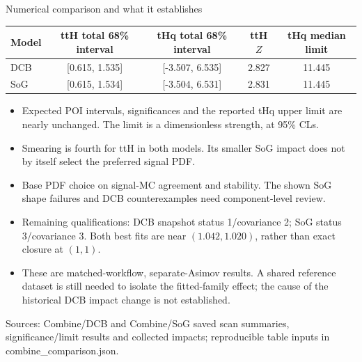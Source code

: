 \documentclass[aspectratio=169,10pt]{beamer}
\begin{document}
\begin{frame}{Numerical comparison and what it establishes}
\begin{center}\small
\begin{tabular}{lcccc}\toprule
Model & ttH total 68\% interval & tHq total 68\% interval & ttH $Z$ & tHq median limit\\\midrule
DCB & [0.615, 1.535] & [-3.507, 6.535] & 2.827 & 11.445 \\
SoG & [0.615, 1.534] & [-3.504, 6.531] & 2.831 & 11.445 \\
\bottomrule\end{tabular}\end{center}
\begin{itemize}
\item Expected POI intervals, significances and the reported tHq upper limit are nearly unchanged. The limit is a dimensionless strength, at 95\% CLs.
\item Smearing is fourth for ttH in both models. Its smaller SoG impact does not by itself select the preferred signal PDF.
\item Base PDF choice on signal-MC agreement and stability. The shown SoG shape failures and DCB counterexamples need component-level review.
\item Remaining qualifications: DCB snapshot status 1/covariance 2; SoG status 3/covariance 3. Both best fits are near $(1.042,1.020)$, rather than exact closure at $(1,1)$.
\item These are matched-workflow, separate-Asimov results. A shared reference dataset is still needed to isolate the fitted-family effect; the cause of the historical DCB impact change is not established.
\end{itemize}
\vfill\tiny Sources: Combine/DCB and Combine/SoG saved scan summaries, significance/limit results and collected impacts; reproducible table inputs in combine\_comparison.json.
\end{frame}
\end{document}
